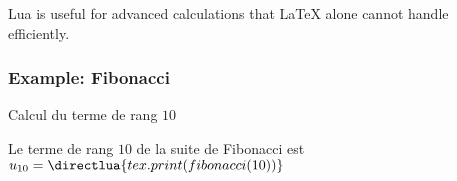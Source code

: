 Lua is useful for advanced calculations that LaTeX alone cannot handle efficiently.

\vspace{1em}
\begin{tkzexample}[latex=.5\textwidth]
\end{tkzexample}
%
\subsubsection{Example: Fibonacci} %
\label{ssub:fibonacci}

 \vspace{1em}
  Calcul du terme de rang $10$

\vspace{1em}
\begin{tkzexample}[latex = .4\textwidth]
    Le terme de rang $10$ de la suite de
    Fibonacci est
    \(u_{10}=\directlua{tex.print(
    fibonacci(10))}\)
\end{tkzexample}
%
%
%
%
%
%
